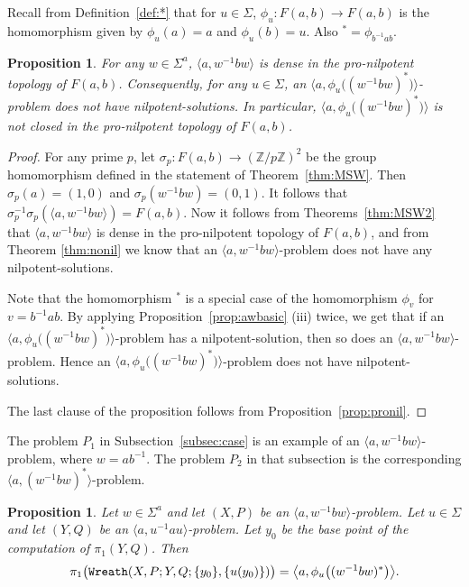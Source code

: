 \documentclass[11pt]{amsart}
\newtheorem{proposition}[theorem]{Proposition}
\theoremstyle{definition}
\theoremstyle{definition}
\numberwithin{equation}{section}
\begin{document}
Recall from Definition~\ref{def:*} that for $u\in \Sigma$, $\phi_u\colon F(a, b)\to F(a, b)$ is the homomorphism given by $\phi_u(a)=a$ and $\phi_u(b)=u$. Also ${}^*=\phi_{b^{-1}ab}$.

\begin{proposition}\label{prop:stationary} For any $w\in \Sigma^a$, $\langle a, w^{-1}bw\rangle$ is dense in the pro-nilpotent topology of $F(a, b)$. Consequently, for any $u\in \Sigma$, an $\big\langle a, \phi_u\big((w^{-1}bw)^*\big)\big\rangle$-problem does not have nilpotent-solutions. In particular, $\big\langle a, \phi_u\big((w^{-1}bw)^*\big)\big\rangle$ is not closed in the pro-nilpotent topology of $F(a, b)$. 
\end{proposition}

\begin{proof} For any prime $p$, let $\sigma_p\colon F(a, b)\to (\mathbb{Z}/p\mathbb{Z})^2$ be the group homomorphism defined in the statement of Theorem~\ref{thm:MSW}. Then $\sigma_p(a)=(1,0)$ and $\sigma_p(w^{-1}bw)=(0,1)$. It follows that $\sigma_p^{-1}\sigma_p(\langle a, w^{-1}bw\rangle)=F(a, b)$. Now it follows from Theorems~\ref{thm:MSW2} that $\langle a, w^{-1}bw\rangle$ is dense in the pro-nilpotent topology of $F(a, b)$, and from Theorem \ref{thm:nonil} we know that an $\langle a, w^{-1}bw\rangle$-problem does not have any nilpotent-solutions.

Note that the homomorphism ${}^*$ is a special case of the homomorphism $\phi_v$ for $v=b^{-1}ab$. By applying Proposition~\ref{prop:awbasic} (iii) twice, we get that if an $\big\langle a, \phi_u\big((w^{-1}bw)^*\big)\big\rangle$-problem has a nilpotent-solution, then so does an $\langle a, w^{-1}bw\rangle$-problem. Hence an $\big\langle a, \phi_u\big((w^{-1}bw)^*\big)\big\rangle$-problem does not have nilpotent-solutions. 

The last clause of the proposition follows from Proposition~\ref{prop:pronil}.
\end{proof}

The problem $P_1$ in Subsection~\ref{subsec:case} is an example of an $\langle a, w^{-1}bw\rangle$-problem, where $w=ab^{-1}$. The problem $P_2$ in that subsection is the corresponding $\langle a, (w^{-1}bw)^*\rangle$-problem.


\begin{proposition}\label{prop:wrsolution} Let $w\in \Sigma^a$ and let $(X, P)$ be an $\langle a, w^{-1}bw\rangle$-problem. Let $u\in \Sigma$ and let $(Y, Q)$ be an $\langle a, u^{-1}au\rangle$-problem. Let $y_0$ be the base point of the computation of $\pi_1(Y, Q)$. Then 
$$\pi_1\big(\mbox{\tt Wreath}(X,P; Y, Q; \{y_0\}, \{u(y_0)\})\big)=
\big\langle a, \phi_u\big((w^{-1}bw)^*\big)\big\rangle. $$
\end{proposition}
\end{document}
